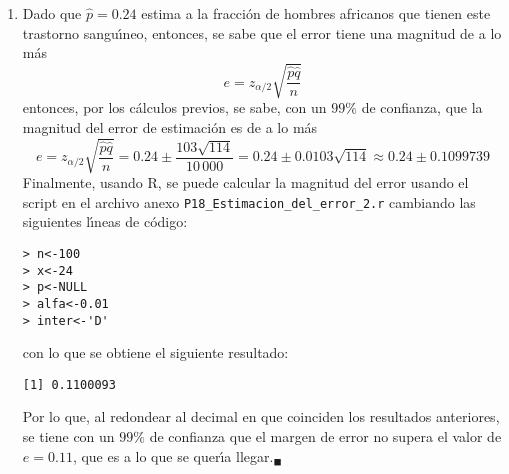 \begin{solucion}
\begin{enumerate}
  \item Dado que $\hat{p} = 0.24$ estima a la fracci\'on de hombres africanos que tienen este trastorno sangu\'{\i}neo, entonces, se sabe que el error tiene una magnitud de a lo m\'as
  \begin{equation*}
   e = z_{\alpha/2}\sqrt{\frac{\hat{p}\hat{q}}{n}}
  \end{equation*}
  entonces, por los c\'alculos previos, se sabe, con un $99\%$ de confianza, que la magnitud del error de estimaci\'on es de a lo m\'as
  \begin{equation*}
   e = z_{\alpha/2}\sqrt{\frac{\hat{p}\hat{q}}{n}} = 0.24 \pm \frac{103\sqrt{114}}{10\,000} = 0.24 \pm 0.0103\sqrt{114} \approx 0.24 \pm 0.1099739
  \end{equation*}
  Finalmente, usando R, se puede calcular la magnitud del error usando el script en el archivo anexo \texttt{P18\_Estimacion\_del\_error\_2.r} cambiando las siguientes l\'{\i}neas de c\'odigo:
  \begin{verbatim}
> n<-100
> x<-24
> p<-NULL
> alfa<-0.01
> inter<-'D'
  \end{verbatim}
  \vspace{-0.5cm}
  con lo que se obtiene el siguiente resultado:
  \begin{verbatim}
[1] 0.1100093
  \end{verbatim}
  \vspace{-0.5cm}
  Por lo que, al redondear al decimal en que coinciden los resultados anteriores, se tiene con un $99\%$ de confianza que el margen de error no supera el valor de $e = 0.11$, que es a lo que se quer\'{\i}a llegar.${}_{\blacksquare}$
 \end{enumerate}
\end{solucion}
